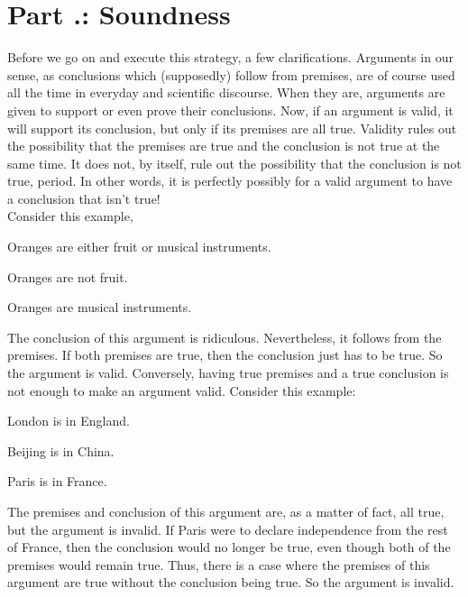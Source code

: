\section{Part \thechapcount.\theseccount: Soundness}
Before we go on and execute this strategy, a few clarifications. Arguments in our sense, as conclusions which (supposedly) follow from premises, are of course used all the time in everyday and scientific discourse. When they are, arguments are given to support or even prove their conclusions. Now, if an argument is valid, it will support its conclusion, but only if its premises are all true. Validity rules out the possibility that the premises are true and the conclusion is not true at the same time. It does not, by itself, rule out the possibility that the conclusion is not true, period. In other words, it is perfectly possibly for a valid argument to have a conclusion that isn’t true!\\
Consider this example,
\begin{earg}
\item[]Oranges are either fruit or musical instruments.
\item[]Oranges are not fruit.
\item[\therefore] Oranges are musical instruments.
\end{earg}
The conclusion of this argument is ridiculous. Nevertheless, it follows from the premises. If both premises are true, then the conclusion just has to be true. So the argument is valid.
Conversely, having true premises and a true conclusion is not enough to make an argument valid. Consider this example:
\begin{earg}
\item[]London is in England.
\item[]Beijing is in China.
\item[\therefore] Paris is in France.
\end{earg}
The premises and conclusion of this argument are, as a matter of fact, all true, but the argument is invalid. If Paris were to declare independence from the rest of France, then the conclusion would no longer be true, even though both of the premises would remain true. Thus, there is a case where the premises of this argument are true without the conclusion being true. So the argument is invalid.

